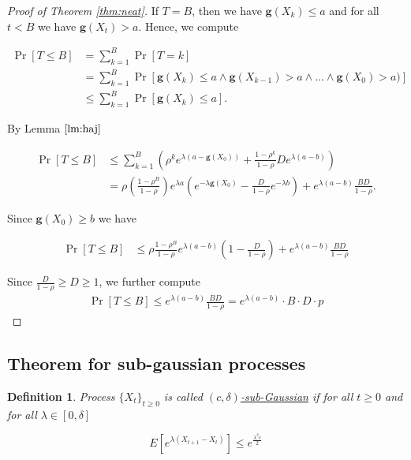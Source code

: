 \documentclass[12pt, a4paper]{article}
\newtheorem*{definition}{Definition}
\newcommand{\gfun}{\mathbf{g}}
\theoremstyle{remark}
\begin{document}
\begin{proof}[Proof of Theorem \ref{thm:neat}]

    If $T = B$, then we have $\gfun(X_k) \leq a$ and for all $t < B$ we have $\gfun(X_t) > a$. Hence, we compute

    \begin{align*}
        \Pr[T \leq B] & = \sum_{k=1}^{B} \Pr[T = k]                                                                        \\
                      & = \sum_{k=1}^{B} \Pr[\gfun(X_k) \leq a \land \gfun(X_{k - 1}) > a \land ... \land \gfun(X_0) > a)] \\
                      & \leq \sum_{k=1}^{B} \Pr[\gfun(X_k) \leq a].
    \end{align*}

    By Lemma $\ref{lm:haj}$

    \begin{align*}
        \Pr[T \leq B] & \leq \sum_{k=1}^{B} \left(\rho^k e^{\lambda(a - \gfun(X_0))} + \frac{1 - \rho^k}{1 - \rho} D e^{\lambda(a - b)}\right)                                                          \\
                      & = \rho \left(\frac{1 - \rho^B}{1 - \rho}\right) e^{\lambda a}\left(e^{-\lambda\gfun(X_0)} - \frac{D}{1 - \rho} e^{-\lambda b}\right) + e^{\lambda(a - b)} \frac{B D}{1 - \rho}.
    \end{align*}

    Since $\gfun(X_0) \ge b$ we have

    \begin{align*}
        \Pr[T \leq B] & \leq \rho \frac{1 - \rho^B}{1 - \rho} e^{\lambda (a - b)}\left(1 - \frac{D}{1 - \rho}\right) + e^{\lambda(a - b)} \frac{B D}{1 - \rho}
    \end{align*}

    Since $\frac{D}{1 - \rho} \geq D \geq 1 $, we further compute
    \begin{align*}
        \Pr[T \leq B] \leq e^{\lambda(a - b)} \frac{B D}{1 - \rho} = e^{\lambda(a - b)} \cdot B \cdot D \cdot p
    \end{align*}

\end{proof}
\subsection{Theorem for sub-gaussian processes}

\begin{definition}
    Process \(\{X_t\}_{t \geq 0}\) is called \underline{\((c, \delta)\)-sub-Gaussian} if for all \(t \geq 0\) and for all \(\lambda \in [0, \delta]\)

    \[E[e^{\lambda(X_{t + 1} - X_{t})}] \leq e^{\frac{\lambda^2 c}{2}}\]
\end{definition}
\end{document}
